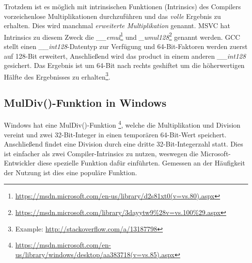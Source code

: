 Trotzdem ist es möglich mit intrinsischen Funktionen (Intrinsics) des Compilers vorzeichenlose Multiplikationen durchzuführen
und das \emph{volle} Ergebnis zu erhalten.
Dies wird manchmal \emph{erweiterte Multiplikation} genannt.
MSVC hat Intrinsics zu diesem Zweck die \emph{\_\_emul}\footnote{\url{https://msdn.microsoft.com/en-us/library/d2s81xt0(v=vs.80).aspx}}
und \emph{\_umul128}\footnote{\url{https://msdn.microsoft.com/library/3dayytw9%28v=vs.100%29.aspx}} genannt werden.
GCC stellt einen \emph{\_\_int128}-Datentyp zur Verfügung und 64-Bit-Faktoren werden zuerst auf 128-Bit erweitert,
Anschließend wird das \gls{product} in einem anderen \emph{\_\_int128} gesichert.
Das Ergebnis ist um 64-Bit nach rechts geshiftet um die höherwertigen Hälfte des Ergebnisses
zu erhalten\footnote{Example: \url{http://stackoverflow.com/a/13187798}}.

\subsection{MulDiv()-Funktion in Windows}

Windows hat eine MulDiv()-Funktion
\footnote{\url{https://msdn.microsoft.com/en-us/library/windows/desktop/aa383718(v=vs.85).aspx}},
welche die Multiplikation und Division vereint und zwei 32-Bit-Integer in einen temporären 64-Bit-Wert
speichert. Anschließend findet eine Division durch eine dritte 32-Bit-Integerzahl statt.
Dies ist einfacher als zwei Compiler-Intrinsics zu nutzen, weswegen die Microsoft-Entwickler diese
spezielle Funktion dafür einführten.
Gemessen an der Häufigkeit der Nutzung ist dies eine populäre Funktion.
